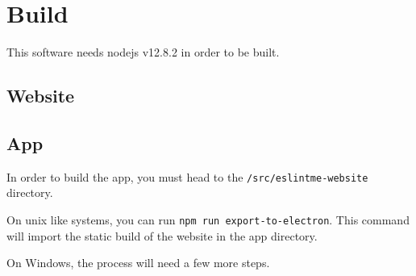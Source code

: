 \section{Build}
This software needs nodejs v12.8.2 in order to be built. 
\subsection{Website}
\subsection{App}

In order to build the app, you must head to the 
\verb|/src/eslintme-website| directory.

On unix like systems, you can run \verb|npm run export-to-electron|. 
This command will import the static build of the website in the app directory.

On Windows, the process will need a few more steps.